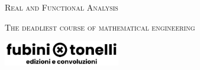 

\vspace{0.8cm}
{\textsc{\Huge Real and Functional Analysis}}

{\scshape\large The deadliest course of mathematical engineering \par}

\begin{center}
  {
  \includegraphics[width=0.38\textwidth]{images/logo.png}}
\end{center}